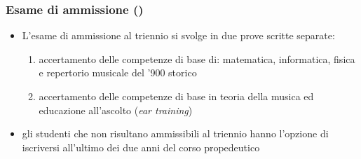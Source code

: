 %
%
%

\setcounter{ms}{0}
\begin{frame}
    \frametitle<+->{Esame di ammissione ()}

	\begin{itemize}[<+- | alert@+->]

		\item L'esame di ammissione al triennio si svolge in due prove scritte
          separate:

      \begin{enumerate}[<+- | alert@+->]

        \item accertamento delle competenze di base di: matematica,
        informatica, fisica e repertorio musicale del '900 storico


        \item accertamento delle competenze di base in teoria della musica ed
        educazione all'ascolto (\emph{ear training})

     \end{enumerate}

    \item gli studenti che non risultano ammissibili al triennio hanno
    l'opzione di iscriversi all'ultimo dei due anni del corso propedeutico

	\end{itemize}

\end{frame}
